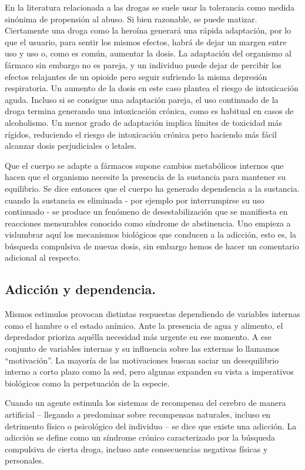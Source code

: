 En la literatura relacionada a las drogas se suele usar la tolerancia como medida sinónima de propensión al abuso. Si bien razonable, se puede matizar. Ciertamente una droga como la heroína generará una rápida adaptación, por lo que el usuario, para sentir los mismos efectos, habrá de dejar un margen entre uso y uso o, como es común, aumentar la dosis. La adaptación del organismo al fármaco sin embargo no es pareja, y un individuo puede dejar de percibir los efectos relajantes de un opioide pero seguir sufriendo la misma depresión respiratoria. Un aumento de la dosis en este caso plantea el riesgo de intoxicación aguda. Incluso si se consigue una adaptación pareja, el uso continuado de la droga termina generando una intoxicación crónica, como es habitual en casos de alcoholismo. Un menor grado de adaptación implica límites de toxicidad más rígidos, reduciendo el riesgo de intoxicación crónica pero haciendo más fácil alcanzar dosis perjudiciales o letales.

Que el cuerpo se adapte a fármacos supone cambios metabólicos internos que hacen que el organismo necesite la presencia de la sustancia para mantener su equilibrio. Se dice entonces que el cuerpo ha generado dependencia a la sustancia. cuando la sustancia es eliminada - por ejemplo por interrumpirse su uso continuado - se produce un fenómeno de desestabilización que se manifiesta en reacciones mensurables conocido como síndrome de abstinencia. Uno empieza a vislumbrar aquí los mecanismos biológicos que conducen a la adicción, esto es, la búsqueda compulsiva de nuevas dosis, sin embargo hemos de hacer un comentario adicional al respecto.

\subsection{Adicción y dependencia.}

Mismos estimulos provocan distintas respuestas dependiendo de variables internas como el hambre o el estado anímico. Ante la presencia de agua y alimento, el depredador prioriza aquélla necesidad más urgente en ese momento. A ese conjunto de variables internas y su influencia sobre las externas lo llamamos \enquote{motivación}. La mayoría de las motivaciones buscan saciar un desequilibrio interno a corto plazo como la sed, pero algunas expanden su vista a imperativos biológicos como la perpetuación de la especie.

Cuando un agente estimula los sistemas de recompensa del cerebro de manera artificial – llegando a predominar sobre recompensas naturales, incluso en detrimento físico o psicológico del individuo – se dice que existe una adicción. La adicción se define como un síndrome crónico caracterizado por la búsqueda compulsiva de cierta droga, incluso ante consecuencias negativas físicas y personales.

